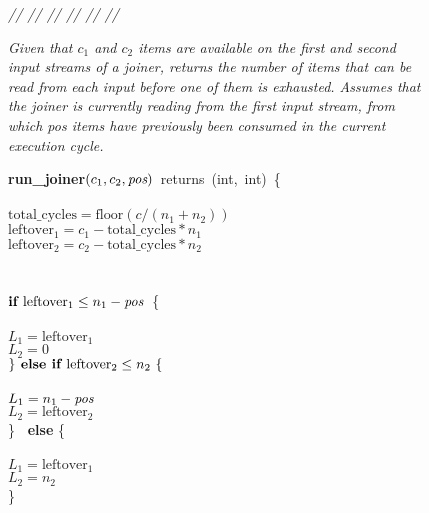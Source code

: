 \begin{figure}[t]
\begin{minipage}{0.1in}
\vspace{-1.75pt}
{\it // // // // // //}
\end{minipage}
\begin{minipage}{3.23in}
{\it Given that $c_1$ and $c_2$ items are available on the first and
  second input streams of a joiner, returns the number of items that
  can be read from each input before one of them is exhausted.
  Assumes that the joiner is currently reading from the first input
  stream, from which \mbox{pos} items have previously been consumed in
  the current execution cycle.}
\end{minipage}
\mbox{\bf run\_joiner}$(c_1, c_2, \mbox{\it pos} )$~returns~(int,~int)~\{\\
\\
\tab$\mbox{total\_cycles} = \mbox{floor}(c/(n_1 + n_2))$\\
\tab$\mbox{leftover}_1 = c_1 - \mbox{total\_cycles} * n_1$\\
\tab$\mbox{leftover}_2 = c_2 - \mbox{total\_cycles} * n_2$\\
~ \vspace{-6pt}\\
\\
\tab$\mbox{\bf if~} \mbox{leftover}_1 \leq n_1 - \mbox{\it pos}$~\{\\
\tab{}\\
\tab\tab$L_1 = \mbox{leftover}_1$\\
\tab\tab$L_2 = 0$\\
\tab$\} \mbox{\bf~else if~} \mbox{leftover}_2 \leq n_2~\{$\\
\tab{}\\
\tab\tab$L_1 = n_1-\mbox{\it pos}$\\
\tab\tab$L_2 = \mbox{leftover}_2$\\
\tab\} \mbox{\bf ~else} \{\\
\tab{}\\
\tab\tab$L_1 = \mbox{leftover}_1$\\
\tab\tab$L_2 = n_2$\\
\tab\}\\
~ \vspace{-6pt}\\ 

\end{figure}
